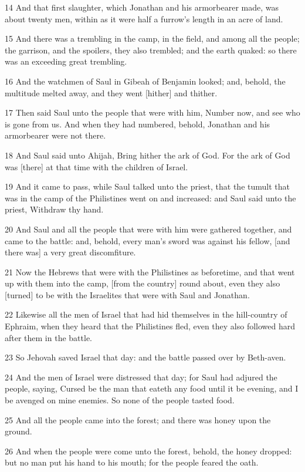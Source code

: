 \par 14 And that first slaughter, which Jonathan and his armorbearer made, was about twenty men, within as it were half a furrow's length in an acre of land.
\par 15 And there was a trembling in the camp, in the field, and among all the people; the garrison, and the spoilers, they also trembled; and the earth quaked: so there was an exceeding great trembling.
\par 16 And the watchmen of Saul in Gibeah of Benjamin looked; and, behold, the multitude melted away, and they went [hither] and thither.
\par 17 Then said Saul unto the people that were with him, Number now, and see who is gone from us. And when they had numbered, behold, Jonathan and his armorbearer were not there.
\par 18 And Saul said unto Ahijah, Bring hither the ark of God. For the ark of God was [there] at that time with the children of Israel.
\par 19 And it came to pass, while Saul talked unto the priest, that the tumult that was in the camp of the Philistines went on and increased: and Saul said unto the priest, Withdraw thy hand.
\par 20 And Saul and all the people that were with him were gathered together, and came to the battle: and, behold, every man's sword was against his fellow, [and there was] a very great discomfiture.
\par 21 Now the Hebrews that were with the Philistines as beforetime, and that went up with them into the camp, [from the country] round about, even they also [turned] to be with the Israelites that were with Saul and Jonathan.
\par 22 Likewise all the men of Israel that had hid themselves in the hill-country of Ephraim, when they heard that the Philistines fled, even they also followed hard after them in the battle.
\par 23 So Jehovah saved Israel that day: and the battle passed over by Beth-aven.
\par 24 And the men of Israel were distressed that day; for Saul had adjured the people, saying, Cursed be the man that eateth any food until it be evening, and I be avenged on mine enemies. So none of the people tasted food.
\par 25 And all the people came into the forest; and there was honey upon the ground.
\par 26 And when the people were come unto the forest, behold, the honey dropped: but no man put his hand to his mouth; for the people feared the oath.
